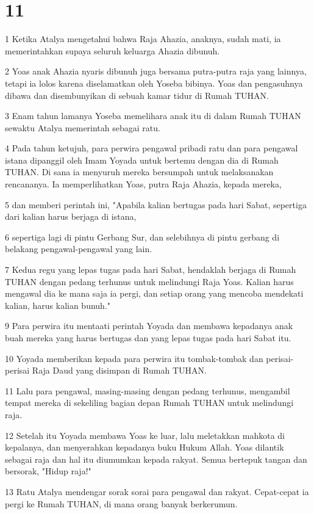 \chapter{11}

\par 1 Ketika Atalya mengetahui bahwa Raja Ahazia, anaknya, sudah mati, ia memerintahkan supaya seluruh keluarga Ahazia dibunuh.
\par 2 Yoas anak Ahazia nyaris dibunuh juga bersama putra-putra raja yang lainnya, tetapi ia lolos karena diselamatkan oleh Yoseba bibinya. Yoas dan pengasuhnya dibawa dan disembunyikan di sebuah kamar tidur di Rumah TUHAN.
\par 3 Enam tahun lamanya Yoseba memelihara anak itu di dalam Rumah TUHAN sewaktu Atalya memerintah sebagai ratu.
\par 4 Pada tahun ketujuh, para perwira pengawal pribadi ratu dan para pengawal istana dipanggil oleh Imam Yoyada untuk bertemu dengan dia di Rumah TUHAN. Di sana ia menyuruh mereka bersumpah untuk melaksanakan rencananya. Ia memperlihatkan Yoas, putra Raja Ahazia, kepada mereka,
\par 5 dan memberi perintah ini, "Apabila kalian bertugas pada hari Sabat, sepertiga dari kalian harus berjaga di istana,
\par 6 sepertiga lagi di pintu Gerbang Sur, dan selebihnya di pintu gerbang di belakang pengawal-pengawal yang lain.
\par 7 Kedua regu yang lepas tugas pada hari Sabat, hendaklah berjaga di Rumah TUHAN dengan pedang terhunus untuk melindungi Raja Yoas. Kalian harus mengawal dia ke mana saja ia pergi, dan setiap orang yang mencoba mendekati kalian, harus kalian bunuh."
\par 9 Para perwira itu mentaati perintah Yoyada dan membawa kepadanya anak buah mereka yang harus bertugas dan yang lepas tugas pada hari Sabat itu.
\par 10 Yoyada memberikan kepada para perwira itu tombak-tombak dan perisai-perisai Raja Daud yang disimpan di Rumah TUHAN.
\par 11 Lalu para pengawal, masing-masing dengan pedang terhunus, mengambil tempat mereka di sekeliling bagian depan Rumah TUHAN untuk melindungi raja.
\par 12 Setelah itu Yoyada membawa Yoas ke luar, lalu meletakkan mahkota di kepalanya, dan menyerahkan kepadanya buku Hukum Allah. Yoas dilantik sebagai raja dan hal itu diumumkan kepada rakyat. Semua bertepuk tangan dan bersorak, "Hidup raja!"
\par 13 Ratu Atalya mendengar sorak sorai para pengawal dan rakyat. Cepat-cepat ia pergi ke Rumah TUHAN, di mana orang banyak berkerumun.
